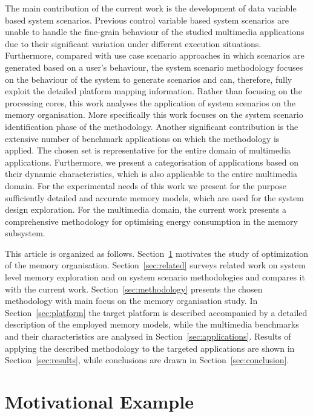 \documentclass[smallcondensed]{svjour3}
\begin{document}
The main contribution of the current work is the development of data variable \cite{Elena2012} based system scenarios.
Previous control variable based system scenarios \cite{Gheorghita2007} are unable to handle the fine-grain behaviour of the studied multimedia applications due to their significant variation under different execution situations. 
Furthermore, compared with use case scenario approaches in which scenarios are generated based on a user's behaviour, the system scenario methodology focuses on the behaviour of the system to generate scenarios and can, therefore, fully exploit the detailed platform mapping information. 
Rather than focusing on the processing cores, this work analyses the application of system scenarios on the memory organisation. 
More specifically this work focuses on the system scenario identification phase of the methodology.
Another significant contribution is the extensive number of benchmark applications on which the methodology is applied.
The chosen set is representative for the entire domain of multimedia applications.
Furthermore, we present a categorisation of applications based on their dynamic characteristics, which is also applicable to the entire multimedia domain. 
For the experimental needs of this work we present for the purpose sufficiently detailed and accurate  memory models, which are used for the system design exploration.
For the multimedia domain, the current work presents a comprehensive methodology for optimising energy consumption in the memory subsystem.

This article is organized as follows. 
Section~\ref{sec:motivation} motivates the study of optimization of the memory organisation. 
Section~\ref{sec:related} surveys related work on system level memory exploration and on system scenario methodologies and compares it with the current work. 
Section~\ref{sec:methodology} presents the chosen methodology with main focus on the memory organisation study. 
In Section~\ref{sec:platform} the target platform is described accompanied by a detailed description of the employed memory models, while the multimedia benchmarks and their characteristics are analysed in Section~\ref{sec:applications}. 
Results of applying the described methodology to the targeted applications are shown in Section~\ref{sec:results}, while conclusions are drawn in Section~\ref{sec:conclusion}. 

\section{Motivational Example}
\label{sec:motivation}
\end{document}
